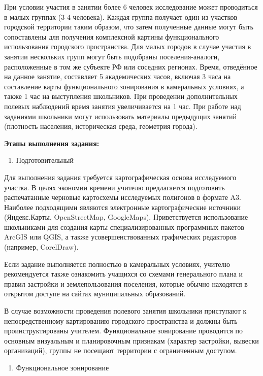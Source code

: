 \documentclass[
  11pt,
]{book}
\providecommand{\tightlist}{%
  \setlength{\itemsep}{0pt}\setlength{\parskip}{0pt}}
\begin{document}
При условии участия в занятии более 6 человек исследование может проводиться в малых группах (3-4 человека). Каждая группа
получает один из участков городской территории таким образом, что затем полученные данные могут быть сопоставлены для получения комплексной картины функционального использования городского пространства. Для малых городов в случае участия в занятии нескольких групп могут быть подобраны поселения-аналоги, расположенные в том же субъекте РФ или соседних регионах.
Время, отведённое на данное занятие, составляет 5 академических часов, включая 3 часа на составление карты функционального
зонирования в камеральных условиях, а также 1 час на выступления школьников. При проведении дополнительных полевых наблюдений время занятия увеличивается на 1 час. При работе над заданиями школьники могут использовать материалы предыдущих занятий (плотность населения, историческая среда, геометрия города).

\textbf{Этапы выполнения задания:}

\begin{enumerate}
\def\labelenumi{\arabic{enumi}.}
\tightlist
\item
  Подготовительный
\end{enumerate}

Для выполнения задания требуется картографическая основа исследуемого участка. В целях экономии времени учителю
предлагается подготовить распечатанные черновые картосхемы исследуемых полигонов в формате A3. Наиболее подходящими являются электронные картографические источники (Яндекс.Карты, OpenStreetMap, GoogleMaps). Приветствуется использование школьниками для создания карты специализированных программных пакетов ArcGIS или QGIS, а также усовершенствованных графических редакторов (например, CorelDraw).

Если задание выполняется полностью в камеральных условиях, учителю рекомендуется также ознакомить учащихся со схемами
генерального плана и правил застройки и землепользования поселения, которые обычно находятся в открытом доступе на сайтах муниципальных образований.

В случае возможности проведения полевого занятия школьники приступают к непосредственному картированию городского пространства и
должны быть проинструктированы учителем. Функциональное зонирование проводится по основным визуальным и планировочным признакам (характер застройки, вывески организаций), группы не посещают территории с ограниченным доступом.

\begin{enumerate}
\def\labelenumi{\arabic{enumi}.}
\setcounter{enumi}{1}
\tightlist
\item
  Функциональное зонирование
\end{enumerate}
\end{document}
